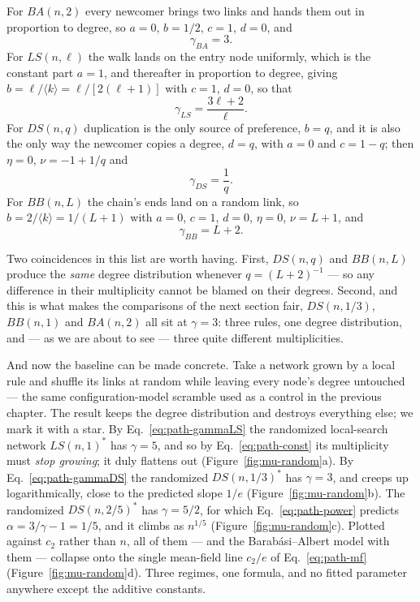 For $BA(n,2)$ every newcomer brings two links and hands them out in proportion to
degree, so $a=0$, $b=1/2$, $c=1$, $d=0$, and
\begin{equation}
  \gamma_{BA} = 3 .
  \label{eq:path-gammaBA}
\end{equation}
For $LS(n,\ell)$ the walk lands on the entry node uniformly, which is the constant
part $a=1$, and thereafter in proportion to degree, giving
$b=\ell/\langle k\rangle=\ell/[2(\ell+1)]$ with $c=1$, $d=0$, so that
\begin{equation}
  \gamma_{LS} = \frac{3\ell+2}{\ell} .
  \label{eq:path-gammaLS}
\end{equation}
For $DS(n,q)$ duplication is the only source of preference, $b=q$, and it is also
the only way the newcomer copies a degree, $d=q$, with $a=0$ and $c=1-q$; then
$\eta=0$, $\nu=-1+1/q$ and
\begin{equation}
  \gamma_{DS} = \frac{1}{q} .
  \label{eq:path-gammaDS}
\end{equation}
For $BB(n,L)$ the chain's ends land on a random link, so $b=2/\langle
k\rangle=1/(L+1)$ with $a=0$, $c=1$, $d=0$, $\eta=0$, $\nu=L+1$, and
\begin{equation}
  \gamma_{BB} = L+2 .
  \label{eq:path-gammaBB}
\end{equation}

Two coincidences in this list are worth having. First, $DS(n,q)$ and $BB(n,L)$
produce the \emph{same} degree distribution whenever $q=(L+2)^{-1}$ --- so any
difference in their multiplicity cannot be blamed on their degrees. Second, and
this is what makes the comparisons of the next section fair, $DS(n,1/3)$,
$BB(n,1)$ and $BA(n,2)$ all sit at $\gamma=3$: three rules, one degree
distribution, and --- as we are about to see --- three quite different
multiplicities.

And now the baseline can be made concrete. Take a network grown by a local rule and
shuffle its links at random while leaving every node's degree untouched --- the same
configuration-model scramble used as a control in the previous chapter. The result
keeps the degree distribution and destroys everything else; we mark it with a star.
By Eq.~\eqref{eq:path-gammaLS} the randomized local-search network $LS(n,1)^*$ has
$\gamma=5$, and so by Eq.~\eqref{eq:path-const} its multiplicity must
\emph{stop growing}; it duly flattens out (Figure~\ref{fig:mu-random}a). By
Eq.~\eqref{eq:path-gammaDS} the randomized $DS(n,1/3)^*$ has $\gamma=3$, and creeps
up logarithmically, close to the predicted slope $1/e$
(Figure~\ref{fig:mu-random}b). The randomized $DS(n,2/5)^*$ has $\gamma=5/2$, for
which Eq.~\eqref{eq:path-power} predicts $\alpha=3/\gamma-1=1/5$, and it climbs as
$n^{1/5}$ (Figure~\ref{fig:mu-random}c). Plotted against $c_2$ rather than $n$, all
of them --- and the Barab\'asi--Albert model with them --- collapse onto the single
mean-field line $c_2/e$ of Eq.~\eqref{eq:path-mf} (Figure~\ref{fig:mu-random}d).
Three regimes, one formula, and no fitted parameter anywhere except the additive
constants.

